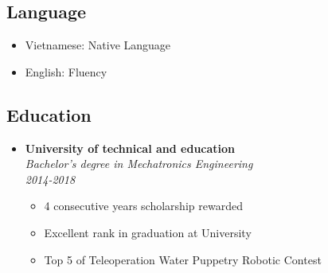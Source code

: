 \documentclass[11pt,oneside,a4paper]{article}
\begin{document}
\begin{tcolorbox}
\begin{minipage}[t]{8cm}
\begin{tcolorbox}[grow to left by=0.6cm, colback=gray!25,colframe=white]
            \section*{Language}
            \begin{itemize}
                \item {Vietnamese: Native Language}
                \item {English: Fluency}
            \end{itemize}
        \end{tcolorbox}
    \end{minipage}
    \begin{minipage}[t]{11cm}
        \vspace*{-0.5cm}
        \begin{tcolorbox}[grow to right by=0.75cm,colback=white,colframe=white]
            \section*{Education}
            \begin{itemize}
                \item 
                {
                    \textbf{University of technical and education} \\
                    \emph{Bachelor’s degree in Mechatronics Engineering} \\
                    \emph{2014-2018}
                    \begin{itemize}[label=$\circ$]
                        \item {4 consecutive years scholarship rewarded}
                        \item {Excellent rank in graduation at University}
                        \item {Top 5 of Teleoperation Water Puppetry Robotic Contest}
                    \end{itemize}
                }
            \end{itemize}


\end{tcolorbox}
\end{minipage}
\end{tcolorbox}
\end{document}
